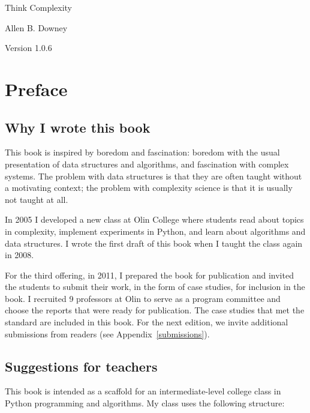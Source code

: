 \documentclass[10pt]{book}
\newcommand{\thetitle}{Think Complexity}
\newcommand{\theversion}{1.0.6}
\begin{document}

\begin{htmlonly}


{\Large \thetitle}

{\large Allen B. Downey}

Version \theversion

\setcounter{chapter}{-1}

\end{htmlonly}

\fi

\chapter{Preface}

\section{Why I wrote this book}

This book is inspired by boredom and fascination: boredom with the
usual presentation of data structures and algorithms, and
fascination with complex systems.  The problem with data structures
is that they are often taught without a motivating context; the
problem with complexity science is that it is usually not taught at
all.

In 2005 I developed a new class at Olin College where students read
about topics in complexity, implement experiments in Python, and learn
about algorithms and data structures.  I wrote the first draft of this
book when I taught the class again in 2008.

For the third offering, in 2011, I prepared the book for publication
and invited the students to submit their work, in the form of case
studies, for inclusion in the book.  I recruited 9 professors at Olin
to serve as a program committee and choose the reports that were ready
for publication.  The case studies that met the standard are included
in this book.  For the next edition, we invite additional submissions
from readers (see Appendix~\ref{submissions}).

\section{Suggestions for teachers}

This book is intended as a scaffold for an intermediate-level college
class in Python programming and algorithms.  My class uses the following
structure:
\end{document}
